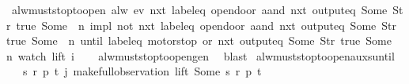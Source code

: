 \begin{isabellebody}
{\ alw{\isacharunderscore}must{\isacharunderscore}stop{\isacharunderscore}to{\isacharunderscore}open{\isacharcolon}\ {\isachardoublequoteopen}alw\ {\isacharparenleft}{\isacharparenleft}ev\ {\isacharparenleft}nxt\ {\isacharparenleft}{\isacharparenleft}label{\isacharunderscore}eq\ {\isacharprime}{\isacharprime}opendoor{\isacharprime}{\isacharprime}{\isacharparenright}\ aand\ {\isacharparenleft}nxt\ {\isacharparenleft}output{\isacharunderscore}eq\ {\isacharbrackleft}Some\ {\isacharparenleft}Str\ {\isacharprime}{\isacharprime}true{\isacharprime}{\isacharprime}{\isacharparenright}{\isacharcomma}\ Some\ \ n{\isacharbrackright}{\isacharparenright}{\isacharparenright}{\isacharparenright}{\isacharparenright}{\isacharparenright}\ impl\ {\isacharparenleft}{\isacharparenleft}not\ {\isacharparenleft}nxt\ {\isacharparenleft}{\isacharparenleft}label{\isacharunderscore}eq\ {\isacharprime}{\isacharprime}opendoor{\isacharprime}{\isacharprime}{\isacharparenright}\ aand\ {\isacharparenleft}nxt\ {\isacharparenleft}output{\isacharunderscore}eq\ {\isacharbrackleft}Some\ {\isacharparenleft}Str\ {\isacharprime}{\isacharprime}true{\isacharprime}{\isacharprime}{\isacharparenright}{\isacharcomma}\ Some\ \ n{\isacharbrackright}{\isacharparenright}{\isacharparenright}{\isacharparenright}{\isacharparenright}{\isacharparenright}\ until\ {\isacharparenleft}{\isacharparenleft}{\isacharparenleft}label{\isacharunderscore}eq\ {\isacharprime}{\isacharprime}motorstop{\isacharprime}{\isacharprime}{\isacharparenright}\ or\ {\isacharparenleft}nxt\ {\isacharparenleft}output{\isacharunderscore}eq\ {\isacharbrackleft}Some\ {\isacharparenleft}Str\ {\isacharprime}{\isacharprime}true{\isacharprime}{\isacharprime}{\isacharparenright}{\isacharcomma}\ Some\ \ n{\isacharbrackright}{\isacharparenright}{\isacharparenright}{\isacharparenright}{\isacharparenright}{\isacharparenright}{\isacharparenright}\ {\isacharparenleft}watch\ lift\ i{\isacharparenright}{\isachardoublequoteclose}\isanewline
%
\isadelimproof
\ \ %
\endisadelimproof
%
\isatagproof
{}\isamarkupfalse%
\ alw{\isacharunderscore}must{\isacharunderscore}stop{\isacharunderscore}to{\isacharunderscore}open{\isacharunderscore}gen\ \isamarkupfalse%
\ blast%
\endisatagproof
{\isafoldproof}%
%
\isadelimproof
%
\endisadelimproof
%
}%
\isamarkupfalse%
\ alw{\isacharunderscore}must{\isacharunderscore}stop{\isacharunderscore}to{\isacharunderscore}open{\isacharunderscore}aux{\isacharunderscore}suntil{\isacharcolon}\isanewline
\ \ \ {\isachardoublequoteopen}{\isasymexists}s\ r\ p\ t{\isachardot}\ j{\isacharequal}\ make{\isacharunderscore}full{\isacharunderscore}observation\ lift\ {\isacharparenleft}Some\ s{\isacharparenright}\ r\ p\ t{\isachardoublequoteclose}\isanewline

\end{isabellebody}
